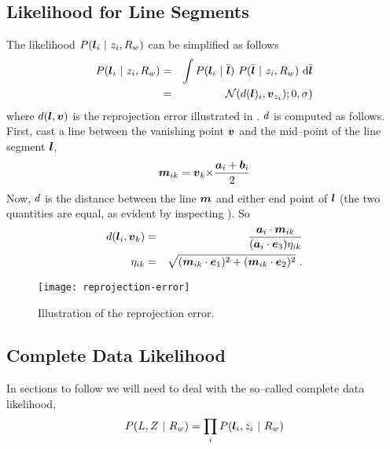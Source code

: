 \subsection{Likelihood for Line Segments}

The likelihood $P(\LineSeg_i ~|~ \Indicator_i,\SceneR)$ can be
simplified as follows
\begin{eqnarray}
  P(\LineSeg_i ~|~ \Indicator_i,\SceneR) &=& 
  \int
    P(\LineSeg_i ~|~ \TrueSeg)
    ~ P(\TrueSeg ~|~ \Indicator_i,\SceneR)
  ~\intd \TrueSeg \\
  &=&
    \NormalDistr(\dist(\LineSeg)_i,\vpt_{\Indicator_i}); 0, \sigma)
\end{eqnarray}
where $\dist(\LineSeg,\vpt)$ is the reprojection error illustrated in
. $\dist$ is computed as follows. First,
cast a line between the vanishing point $\vpt$ and the mid--point of
the line segment $\LineSeg$,
\begin{equation}
  \ReprojLine_{ik} =
    \vpt_k \cross \frac{\StartPt_i+\EndPt_i}{2}
\end{equation}
Now, $\dist$ is the distance between the line $\ReprojLine$ and either
end point of $\LineSeg$ (the two quantities are equal, as evident by
inspecting ). So
\begin{eqnarray}
  \dist(\LineSeg_i,\vpt_k) &=& 
  \frac
    {\StartPt_i \cdot \ReprojLine_{ik}}
    {(\StartPt_{i}\cdot\ez) \eta_{ik}}\\
  \eta_{ik} &=&
   \sqrt{(\ReprojLine_{ik} \cdot \ex)^2 +
         (\ReprojLine_{ik} \cdot \ey)^2}
  ~.
\end{eqnarray}

\begin{figure}[tb]
  \centering
  \texttt{[image: reprojection-error]}
  \caption{Illustration of the reprojection error.}
  \label{fig:reprojection-error}
\end{figure}

\subsection{Complete Data Likelihood}

In sections to follow we will need to deal with the so--called
complete data likelihood,
\begin{equation}
  P(\LineSegs,\Indicators ~|~ \SceneR) =
    \prod_i P(\LineSeg_i,\Indicator_i ~|~ \SceneR)
\end{equation}

